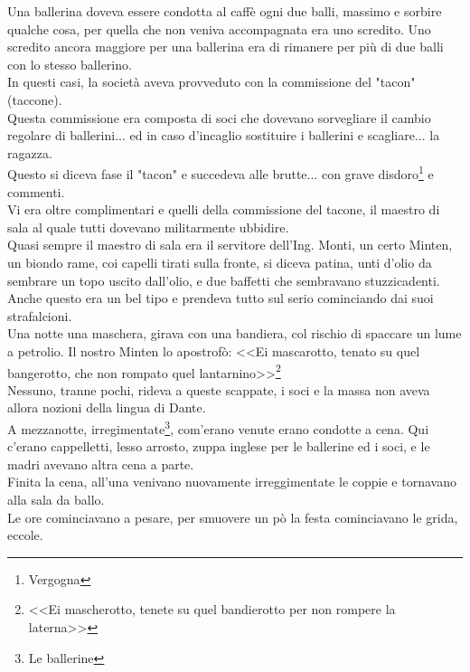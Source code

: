 \indent Una ballerina doveva essere condotta al caffè ogni due balli, massimo e sorbire qualche cosa, per quella che non veniva accompagnata era uno scredito. Uno scredito ancora maggiore per una ballerina era di rimanere per più di due balli con lo stesso ballerino.\\
\indent In questi casi, la società aveva provveduto con la commissione del "tacon" (taccone).\\
\indent Questa commissione era composta di soci che dovevano sorvegliare il cambio regolare di ballerini... ed in caso d'incaglio sostituire i ballerini e scagliare... la ragazza.\\
\indent Questo si diceva fase il "tacon" e succedeva alle brutte... con grave disdoro\footnote{Vergogna} e commenti.\\
\indent Vi era oltre complimentari e quelli della commissione del tacone, il maestro di sala al quale tutti dovevano militarmente ubbidire. \\
\indent Quasi sempre il maestro di sala era il servitore dell'Ing. Monti, un certo Minten, un biondo rame, coi capelli tirati sulla fronte, si diceva patina, unti d'olio da sembrare un topo uscito dall'olio, e due baffetti che sembravano stuzzicadenti. \\
\indent Anche questo era un bel tipo e prendeva tutto sul serio cominciando dai suoi strafalcioni.\\
\indent Una notte una maschera, girava con una bandiera, col rischio di spaccare un lume a petrolio. Il nostro Minten lo apostrofò: <<Ei mascarotto, tenato su quel bangerotto, che non rompato quel lantarnino>>\footnote{<<Ei mascherotto, tenete su quel bandierotto per non rompere la laterna>>}\\
\indent Nessuno, tranne pochi, rideva a queste scappate, i soci e la massa non aveva allora nozioni della lingua di Dante.\\
\indent A mezzanotte, irregimentate\footnote{Le ballerine}, com'erano venute erano condotte a cena. Qui c'erano cappelletti, lesso arrosto, zuppa inglese per le ballerine ed i soci, e le madri avevano altra cena a parte.\\
\indent Finita la cena, all'una venivano nuovamente irreggimentate le coppie e tornavano alla sala da ballo.\\
\indent Le ore cominciavano a pesare, per smuovere un pò la festa cominciavano le grida, eccole.\\
